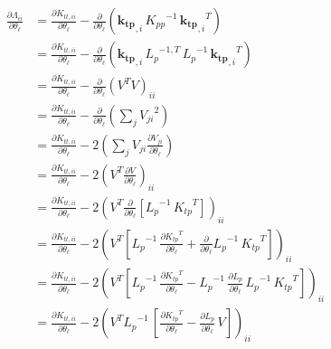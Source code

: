 \documentclass[11pt,a4paper]{article}
\numberwithin{equation}{section}
\begin{document}
\begin{align}
\frac{\partial \Lambda_{ii}}{\partial \theta_\ell}
  &= \frac{\partial K_{tt,ii}}{\partial \theta_\ell} - \frac{\partial}{\partial \theta_\ell}\left(\mathbf{k_{tp}}_{,i}\,{K_{pp}}^{-1}\,{\mathbf{k_{tp}}_{,i}}^T\right) \\
  &= \frac{\partial K_{tt,ii}}{\partial \theta_\ell} - \frac{\partial}{\partial \theta_\ell}\left(\mathbf{k_{tp}}_{,i}\,{L_{p}}^{-1,T}\,{L_p}^{-1}\,{\mathbf{k_{tp}}_{,i}}^T\right) \\
  &= \frac{\partial K_{tt,ii}}{\partial \theta_\ell} - \frac{\partial}{\partial \theta_\ell}\left(V^T V\right)_{ii} \\
  &= \frac{\partial K_{tt,ii}}{\partial \theta_\ell} - \frac{\partial}{\partial \theta_\ell}\left(\sum_j {V_{ji}}^2\right) \\
  &= \frac{\partial K_{tt,ii}}{\partial \theta_\ell} - 2\left(\sum_j V_{ji} \frac{\partial V_{ji}}{\partial \theta_\ell}\right) \\
  &= \frac{\partial K_{tt,ii}}{\partial \theta_\ell} - 2\left(V^T \frac{\partial V}{\partial \theta_\ell}\right)_{ii} \\
  &= \frac{\partial K_{tt,ii}}{\partial \theta_\ell} - 2\left(V^T \frac{\partial }{\partial \theta_\ell}[{L_p}^{-1}\,{K_{tp}}^{T}]\right)_{ii} \\
  &= \frac{\partial K_{tt,ii}}{\partial \theta_\ell} - 2\left(V^T \left[{L_p}^{-1}\,\frac{\partial {K_{tp}}^{T}}{\partial \theta_\ell} + \frac{\partial }{\partial \theta_\ell}{L_p}^{-1}\,{K_{tp}}^{T}\right]\right)_{ii} \\
  &= \frac{\partial K_{tt,ii}}{\partial \theta_\ell} - 2\left(V^T \left[{L_p}^{-1}\,\frac{\partial {K_{tp}}^{T}}{\partial \theta_\ell} - {L_p}^{-1}\,\frac{\partial L_p}{\partial \theta_\ell}\,{L_p}^{-1}\,{K_{tp}}^{T}\right]\right)_{ii} \\
  &= \frac{\partial K_{tt,ii}}{\partial \theta_\ell} - 2\left(V^T {L_p}^{-1}\,\left[\frac{\partial {K_{tp}}^{T}}{\partial \theta_\ell} - \frac{\partial L_p}{\partial \theta_\ell}\,V\right]\right)_{ii}
\end{align}
\end{document}
